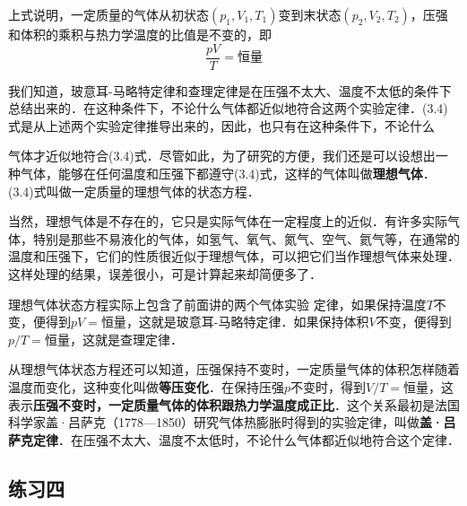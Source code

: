 上式说明，一定质量的气体从初状态$(p_1,V_1,T_1)$变到末状态$(p_2,V_2,T_2)$，压强和体积的乘积与热力学温度的比值是不变的，即
\begin{equation}
\frac{pV}{T}=\text{恒量}
\end{equation}

我们知道，玻意耳-马略特定律和查理定律是在压强不太大、温度不太低的条件下总结出来的．在这种条件下，不论什么气体都近似地符合这两个实验定律．(3.4)式是从上述两个实验定律推导出来的，因此，也只有在这种条件下，不论什么

气体才近似地符合(3.4)式．尽管如此，为了研究的方便，我们还是可以设想出一种气体，能够在任何温度和压强下都遵守(3.4)式，这样的气体叫做\textbf{理想气体}．(3.4)式叫做一定质量的理想气体的状态方程．

当然，理想气体是不存在的，它只是实际气体在一定程度上的近似．有许多实际气体，特别是那些不易液化的气体，如氢气、氧气、氮气、空气、氦气等，在通常的温度和压强下，它们的性质很近似于理想气体，可以把它们当作理想气体来处理．这样处理的结果，误差很小，可是计算起来却简便多了．

理想气体状态方程实际上包含了前面讲的两个气体实验
定律，如果保持温度$T$不变，便得到$pV=\text{恒量}$，这就是玻意耳-马略特定律．如果保持体积$V$不变，便得到$p/T=\text{恒量}$，这就是查理定律．

从理想气体状态方程还可以知道，压强保持不变时，一定质量气体的体积怎样随着温度而变化，这种变化叫做\textbf{等压变化}．在保持压强$p$不变时，得到$V/T=\text{恒量}$，这表示\textbf{压强不变时，一定质量气体的体积跟热力学温度成正比}．这个关系最初是法国科学家盖·吕萨克（1778—1850）研究气体热膨胀时得到的实验定律，叫做\textbf{盖·吕萨克定律}．在压强不太大、温度不太低时，不论什么气体都近似地符合这个定律．


\subsection*{练习四}

